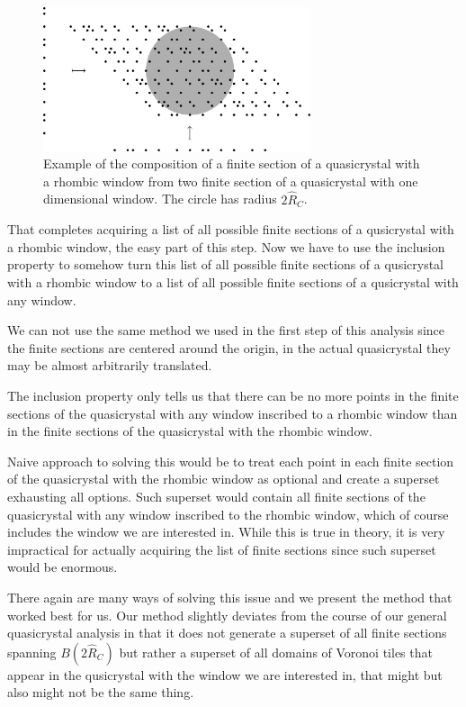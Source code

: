 \documentclass[text.tex]{subfiles}
\begin{document}
\begin{figure}[h!]
\centering
\includegraphics[width=0.7\textwidth]{img/2D/compositionFinite}
\caption{Example of the composition of a finite section of a quasicrystal with a rhombic window from two finite section of a quasicrystal with one dimensional window. The circle has radius $2\hat{R}_C$. }
\label{fig_quasicrystalExampleOctagon}
\end{figure}

That completes acquiring a list of all possible finite sections of a qusicrystal with a rhombic window, the easy part of this step. Now we have to use the inclusion property to somehow turn this list of all possible finite sections of a qusicrystal with a rhombic window to a list of all possible finite sections of a qusicrystal with any window. 

We can not use the same method we used in the first step of this analysis since the finite sections are centered around the origin, in the actual quasicrystal they may be almost arbitrarily translated. 

The inclusion property only tells us that there can be no more points in the finite sections of the quasicrystal with any window inscribed to a rhombic window than in the finite sections of the quasicrystal with the rhombic window. 

Naive approach to solving this would be to treat each point in each finite section of the quasicrystal with the rhombic window as optional and create a superset exhausting all options. Such superset would contain all finite sections of the quasicrystal with any window inscribed to the rhombic window, which of course includes the window we are interested in. While this is true in theory, it is very impractical for actually acquiring the list of finite sections since such superset would be enormous. 

There again are many ways of solving this issue and we present the method that worked best for us. Our method slightly deviates from the course of our general quasicrystal analysis in that it does not generate a superset of all finite sections spanning $B(2\hat{R}_C)$ but rather a superset of all domains of Voronoi tiles that appear in the qusicrystal with the window we are interested in, that might but also might not be the same thing. 
\end{document}
